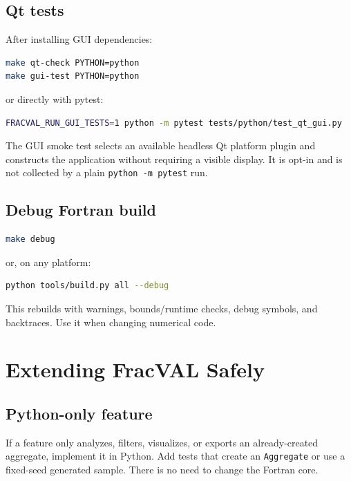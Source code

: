 \documentclass[11pt,oneside]{report}
\newcommand{\code}[1]{\texttt{#1}}
\begin{document}
\section{Qt tests}

After installing GUI dependencies:

\begin{lstlisting}[language=bash]
make qt-check PYTHON=python
make gui-test PYTHON=python
\end{lstlisting}

or directly with pytest:

\begin{lstlisting}[language=bash]
FRACVAL_RUN_GUI_TESTS=1 python -m pytest tests/python/test_qt_gui.py
\end{lstlisting}

The GUI smoke test selects an available headless Qt platform plugin and
constructs the application without requiring a visible display. It is opt-in
and is not collected by a plain \code{python -m pytest} run.

\section{Debug Fortran build}

\begin{lstlisting}[language=bash]
make debug
\end{lstlisting}

or, on any platform:

\begin{lstlisting}[language=bash]
python tools/build.py all --debug
\end{lstlisting}

This rebuilds with warnings, bounds/runtime checks, debug symbols, and
backtraces. Use it when changing numerical code.

\chapter{Extending FracVAL Safely}

\section{Python-only feature}

If a feature only analyzes, filters, visualizes, or exports an already-created
aggregate, implement it in Python. Add tests that create an \code{Aggregate}
or use a fixed-seed generated sample. There is no need to change the Fortran
core.
\end{document}
